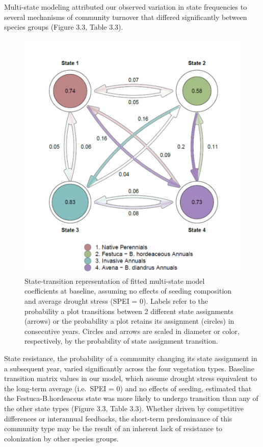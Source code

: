 \documentclass[twoside,12pt,final]{ucthesis-CA2012}
\begin{document}
\begin{ucmainmatter}
Multi-state modeling attributed our observed variation in state frequencies to several mechanisms of community turnover that differed significantly between species groups (Figure 3.3, Table 3.3).
\begin{figure}
\centering
\includegraphics[width=1\textwidth,height=0.8\textheight]{figure/Fig3_3.png}
\caption{State-transition representation of fitted multi-state model coefficients at baseline, assuming no effects of seeding composition and average drought stress (SPEI = 0). Labels refer to the probability a plot transitions between 2 different state assignments (arrows) or the probability a plot retains its assignment (circles) in consecutive years. Circles and arrows are scaled in diameter or color, respectively, by the probability of state assignment transition. \label{fig-3-3}}
\end{figure}
State resistance, the probability of a community changing its state assignment in a subsequent year, varied significantly across the four vegetation types.
Baseline transition matrix values in our model, which assume drought stress equivalent to the long-term average (i.e.~SPEI = 0) and no effects of seeding, estimated that the Festuca-B.hordeaceus state was more likely to undergo transition than any of the other state types (Figure 3.3, Table 3.3).
Whether driven by competitive differences or interannual feedbacks, the short-term predominance of this community type may be the result of an inherent lack of resistance to colonization by other species groups.


\end{ucmainmatter}
\end{document}
